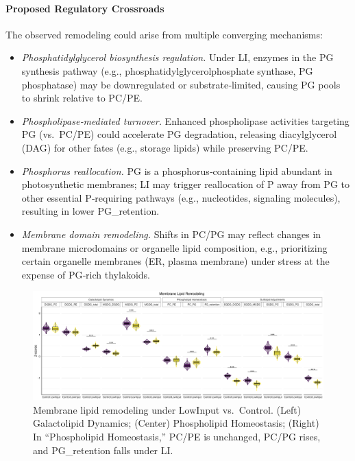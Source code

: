 \documentclass[10pt,letterpaper]{article}
\begin{document}
\paragraph{Proposed Regulatory Crossroads}
The observed remodeling could arise from multiple converging mechanisms:
\begin{itemize}
  \item \textit{Phosphatidylglycerol biosynthesis regulation.}  
        Under LI, enzymes in the PG synthesis pathway (e.g., phosphatidylglycerolphosphate synthase, PG phosphatase) may be downregulated or substrate‑limited, causing PG pools to shrink relative to PC/PE.
  \item \textit{Phospholipase‐mediated turnover.}  
        Enhanced phospholipase activities targeting PG (vs.\ PC/PE) could accelerate PG degradation, releasing diacylglycerol (DAG) for other fates (e.g., storage lipids) while preserving PC/PE.
  \item \textit{Phosphorus reallocation.}  
        PG is a phosphorus‑containing lipid abundant in photosynthetic membranes; LI may trigger reallocation of P away from PG to other essential P‑requiring pathways (e.g., nucleotides, signaling molecules), resulting in lower PG_retention.
  \item \textit{Membrane domain remodeling.}  
        Shifts in PC/PG may reflect changes in membrane microdomains or organelle lipid composition, e.g., prioritizing certain organelle membranes (ER, plasma membrane) under stress at the expense of PG‑rich thylakoids.
\end{itemize}

\begin{figure}[ht]
  \centering
  \includegraphics[width=\textwidth]{fig/main/Fig2_lipid_remodeling.png}
  \caption{Membrane lipid remodeling under LowInput vs.\ Control.
           (Left) Galactolipid Dynamics; (Center) Phospholipid Homeostasis; (Right)            In “Phospholipid Homeostasis,” PC/PE is unchanged, PC/PG rises, and PG_retention falls under LI.}
  \label{fig:lipid_remodeling}
\end{figure}
\end{document}
